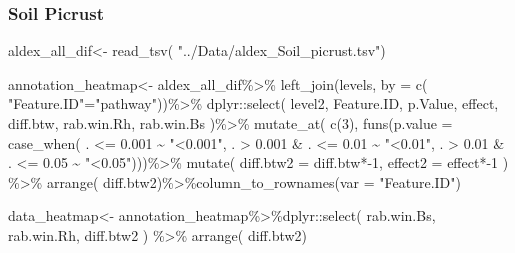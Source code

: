 \documentclass[]{interact}
\theoremstyle{plain}%
\theoremstyle{definition}
\theoremstyle{remark}
\newenvironment{Shaded}{\begin{snugshade}}{\end{snugshade}}
\newcommand{\AttributeTok}[1]{\textcolor[rgb]{0.77,0.63,0.00}{#1}}
\newcommand{\DecValTok}[1]{\textcolor[rgb]{0.00,0.00,0.81}{#1}}
\newcommand{\FloatTok}[1]{\textcolor[rgb]{0.00,0.00,0.81}{#1}}
\newcommand{\FunctionTok}[1]{\textcolor[rgb]{0.00,0.00,0.00}{#1}}
\newcommand{\NormalTok}[1]{#1}
\newcommand{\OtherTok}[1]{\textcolor[rgb]{0.56,0.35,0.01}{#1}}
\newcommand{\SpecialCharTok}[1]{\textcolor[rgb]{0.00,0.00,0.00}{#1}}
\newcommand{\StringTok}[1]{\textcolor[rgb]{0.31,0.60,0.02}{#1}}
\begin{document}
\hypertarget{soil-picrust}{%
\subsubsection{Soil Picrust}\label{soil-picrust}}

\begin{Shaded}
\begin{Highlighting}[]
\NormalTok{aldex\_all\_dif}\OtherTok{\textless{}{-}} \FunctionTok{read\_tsv}\NormalTok{( }\StringTok{"../Data/aldex\_Soil\_picrust.tsv"}\NormalTok{)}

\NormalTok{annotation\_heatmap}\OtherTok{\textless{}{-}}\NormalTok{ aldex\_all\_dif}\SpecialCharTok{\%\textgreater{}\%} \FunctionTok{left\_join}\NormalTok{(levels, }\AttributeTok{by =} \FunctionTok{c}\NormalTok{(}
  \StringTok{"Feature.ID"}\OtherTok{=}\StringTok{"pathway"}\NormalTok{))}\SpecialCharTok{\%\textgreater{}\%}\NormalTok{ dplyr}\SpecialCharTok{::}\FunctionTok{select}\NormalTok{(}
\NormalTok{  level2, Feature.ID, p.Value, effect, diff.btw, rab.win.Rh, rab.win.Bs )}\SpecialCharTok{\%\textgreater{}\%} \FunctionTok{mutate\_at}\NormalTok{(}
    \FunctionTok{c}\NormalTok{(}\DecValTok{3}\NormalTok{), }\FunctionTok{funs}\NormalTok{(}\AttributeTok{p.value =} \FunctionTok{case\_when}\NormalTok{(}
\NormalTok{    . }\SpecialCharTok{\textless{}=} \FloatTok{0.001} \SpecialCharTok{\textasciitilde{}} \StringTok{"\textless{}0.001"}\NormalTok{,}
\NormalTok{    . }\SpecialCharTok{\textgreater{}}  \FloatTok{0.001} \SpecialCharTok{\&}\NormalTok{ .  }\SpecialCharTok{\textless{}=} \FloatTok{0.01} \SpecialCharTok{\textasciitilde{}} \StringTok{"\textless{}0.01"}\NormalTok{,}
\NormalTok{    . }\SpecialCharTok{\textgreater{}}  \FloatTok{0.01} \SpecialCharTok{\&}\NormalTok{ .  }\SpecialCharTok{\textless{}=} \FloatTok{0.05} \SpecialCharTok{\textasciitilde{}} \StringTok{"\textless{}0.05"}\NormalTok{)))}\SpecialCharTok{\%\textgreater{}\%} \FunctionTok{mutate}\NormalTok{(}
      \AttributeTok{diff.btw2 =}\NormalTok{ diff.btw}\SpecialCharTok{*{-}}\DecValTok{1}\NormalTok{, }\AttributeTok{effect2 =}\NormalTok{ effect}\SpecialCharTok{*{-}}\DecValTok{1}\NormalTok{ ) }\SpecialCharTok{\%\textgreater{}\%} \FunctionTok{arrange}\NormalTok{(}
\NormalTok{      diff.btw2)}\SpecialCharTok{\%\textgreater{}\%}\FunctionTok{column\_to\_rownames}\NormalTok{(}\AttributeTok{var =} \StringTok{"Feature.ID"}\NormalTok{)}

\NormalTok{data\_heatmap}\OtherTok{\textless{}{-}}\NormalTok{ annotation\_heatmap}\SpecialCharTok{\%\textgreater{}\%}\NormalTok{dplyr}\SpecialCharTok{::}\FunctionTok{select}\NormalTok{(}
\NormalTok{  rab.win.Bs, rab.win.Rh, diff.btw2 ) }\SpecialCharTok{\%\textgreater{}\%} \FunctionTok{arrange}\NormalTok{(}
\NormalTok{    diff.btw2)}


\end{Highlighting}
\end{Shaded}
\end{document}
